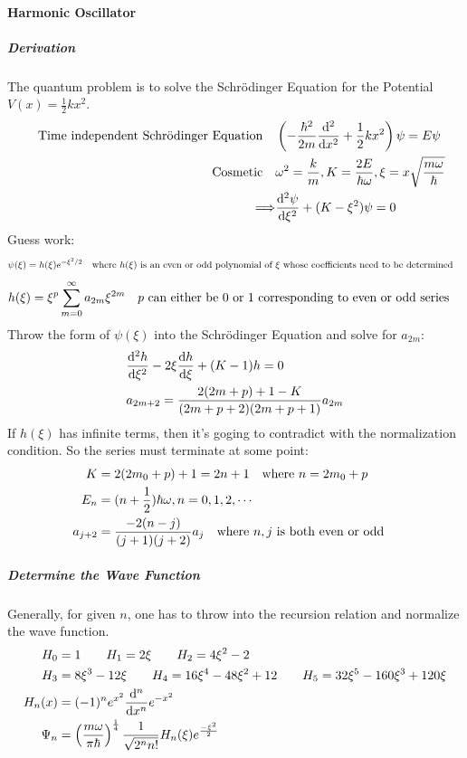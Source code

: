 \documentclass[a4paper,10pt]{article}
\begin{document}
\paragraph{Harmonic Oscillator}
\subparagraph{Derivation}
The quantum problem is to solve the Schrödinger Equation for the Potential $V(x)=\frac{1}{2}kx^2$.
\begin{align*}
    \qq{Time independent Schrödinger Equation} & \left(-\frac{\hbar^2}{2m}\dv[2]{x}+\frac{1}{2}kx^2\right)\psi=E\psi             \\
    \qq{Cosmetic}                              & \omega^2=\frac{k}{m},K=\frac{2E}{\hbar\omega},\xi=x\sqrt{\frac{m\omega}{\hbar}} \\
    \Longrightarrow                            & \dv[2]{\psi}{\xi}+(K-\xi^2)\psi=0
\end{align*}
Guess work:
$$\psi(\xi)=h(\xi)e^{-\xi^2/2} \qq{where $h(\xi)$ is an even or odd polynomial of $\xi$ whose coefficients need to be determined}$$
\begin{align*}
    h(\xi)=\xi^p\sum_{m=0}^{\infty}a_{2m}\xi^{2m}\qq{$p$ can either be 0 or 1 corresponding to even or odd series}
\end{align*}
Throw the form of $\psi(\xi)$ into the Schrödinger Equation and solve for $a_{2m}$:
\begin{align*}
     & \dv[2]{h}{\xi}-2\xi\dv{h}{\xi}+(K-1)h=0             \\
     & a_{2m+2}=\frac{2(2m+p)+1-K}{(2m+p+2)(2m+p+1)}a_{2m}
\end{align*}
If $h(\xi)$ has infinite terms, then it's goging to contradict with the normalization condition. So the series must terminate at some point:
\begin{align*}
    K       & =2(2m_0+p)+1=2n+1\qq{where $n=2m_0+p$}                             \\
    E_n     & =(n+\frac{1}{2})\hbar\omega,n=0,1,2,\cdots                         \\
    a_{j+2} & =\frac{-2(n-j)}{(j+1)(j+2)}a_j\qq{where $n,j$ is both even or odd}
\end{align*}
\subparagraph{Determine the Wave Function}Generally, for given $n$, one has to throw into the recursion relation and normalize the wave function.
\begin{align*}
    H_0    & =1\qq{} H_1=2\xi\qq{}H_2=4\xi^2-2                                                                      \\
    H_3    & =8\xi^3-12\xi\qq{} H_4=16\xi^4-48\xi^2+12\qq{}H_5=32\xi^5-160\xi^3+120\xi                              \\
    H_n(x) & =(-1)^ne^{x^2}\dv[n]{x}e^{-x^2}                                                                        \\
    \Psi_n & =\left(\frac{m\omega}{\pi\hbar}\right)^{\frac{1}{4}}\frac{1}{\sqrt{2^nn!}}H_n(\xi)e^{\frac{-\xi^2}{2}}
\end{align*}
\end{document}
